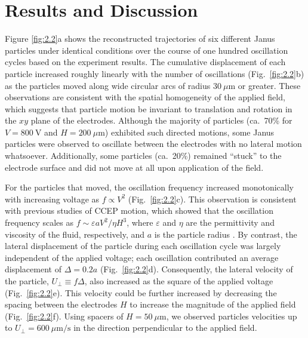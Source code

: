 \section{Results and Discussion}

Figure \ref{fig:2.2}a shows the reconstructed trajectories of six different Janus particles under identical conditions over the course of one hundred oscillation cycles based on the experiment results. 
The cumulative displacement of each particle increased roughly linearly with the number of oscillations (Fig.~\ref{fig:2.2}b) as the particles moved along wide circular arcs of radius $30~\mu\text{m}$ or greater.
These observations are consistent with the spatial homogeneity of the applied field, which suggests that particle motion be invariant to translation and rotation in the $xy$ plane of the electrodes.
Although the majority of particles (ca.~70\% for $V=800~\text{V}$ and $H=200~\mu\text{m}$) exhibited such directed motions, some Janus particles were observed to oscillate between the electrodes with no lateral motion whatsoever.
Additionally, some particles (ca.~20\%) remained ``stuck'' to the electrode surface and did not move at all upon application of the field.

For the particles that moved, the oscillation frequency increased monotonically with increasing voltage as $f \propto V^{2}$ (Fig.~\ref{fig:2.2}c).
This observation is consistent with previous studies of CCEP motion, which showed that the oscillation frequency scales as $f\sim\varepsilon a V^2 / \eta H^3$, where $\varepsilon$ and $\eta$ are the permittivity and viscosity of the fluid, respectively, and $a$ is the particle radius \cite{drews2015contact}.
By contrast, the lateral displacement of the particle during each oscillation cycle was largely independent of the applied voltage; each oscillation contributed an average displacement of $\Delta = 0.2 a$ (Fig.~\ref{fig:2.2}d).
Consequently, the lateral velocity of the particle, $U_{\perp}\equiv f\Delta$, also increased as the square of the applied voltage (Fig.~\ref{fig:2.2}e).
This velocity could be further increased by decreasing the spacing between the electrodes $H$ to increase the magnitude of the applied field (Fig.~\ref{fig:2.2}f). 
Using spacers of $H=50~\mu\text{m}$, we observed particles velocities up to $U_{\perp}=600~\mu\text{m/s}$ in the direction perpendicular to the applied field.


